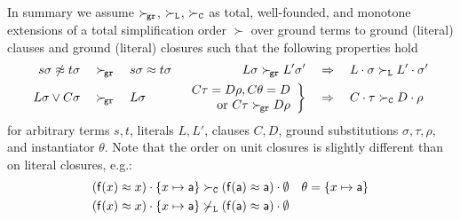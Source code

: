 \begin{remark}
    In summary we assume \( \mathrel\succ_{\!\mathtt{gr}} \), \( \mathrel\succ_{\mathtt{L}} \), \( \mathrel\succ_{\mathtt{C}} \) as
        total, well-founded, and monotone extensions of a
        total simplification order \( \succ \)
        over ground terms to ground (literal) clauses
        and ground (literal) closures
        such that the following properties hold
       \begin{align*}
            s\sigma\not\approx t\sigma \quad&\mathrel\succ_{\!\mathtt{gr}}\quad s\sigma\approx t\sigma
           &
           L\sigma \mathrel\succ_{\!\mathtt{gr}} L'\sigma'
           \quad&\Rightarrow\quad
            L\cdot\sigma \mathrel\succ_{\mathtt{L}} L'\cdot\sigma'
           \\
            L\sigma\lor C\sigma \quad&\mathrel\succ_{\!\mathtt{gr}}\quad L\sigma
       &
       \left.
       \begin{array}{r}
        C\tau=D\rho, C\theta=D
        \\
        \text{or } C\tau\mathrel\succ_{\!\mathtt{gr}} D\rho
    \end{array}
       \right \}
           \quad&\Rightarrow\quad
            C\cdot\tau\mathrel\succ_{\mathtt{C}}{} D\cdot\rho{}
       \end{align*}
        for arbitrary terms \( s,t \),
        literals \( L, L' \),
        clauses \( C,D \),
        ground substitutions \( \sigma, \tau, \rho \),
        and instantiator \( \theta \).
        Note that the order on unit closures is slightly different than on literal closures, e.g.:
       \begin{align*}
            (\mathsf{f}(x)\approx x)\cdot \{ x\mapsto \mathsf{a} \}
            &\mathrel\succ_{\mathtt{C}}
            (\mathsf{f}(\mathsf{a})\approx\mathsf{a})\cdot\emptyset
            & \theta = \{ x\mapsto \mathsf{a} \}
       \\
        (\mathsf{f}(x)\approx x)\cdot \{ x\mapsto \mathsf{a} \}
        &\not\mathrel\succ_{\mathtt{L}}
        (\mathsf{f}(\mathsf{a})\approx\mathsf{a})\cdot\emptyset
       \end{align*}
\end{remark}



